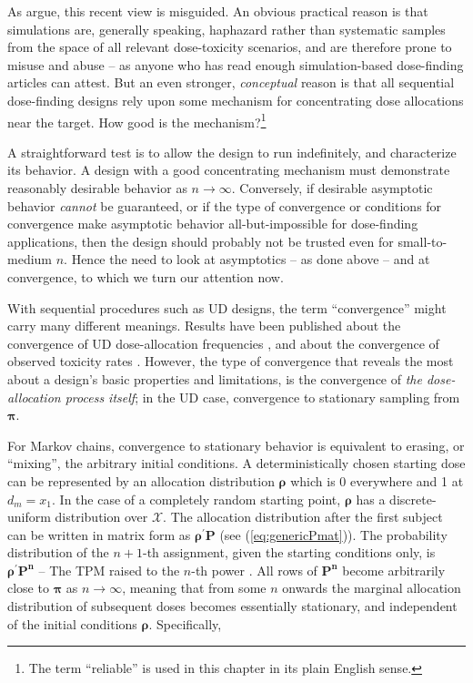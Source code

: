 As \cite{oron:azri:hoff:dose:2011} argue, this recent view is misguided. An obvious practical reason is that simulations are, generally speaking, haphazard rather than systematic samples from the space of all relevant dose-toxicity scenarios, and are therefore prone to misuse and abuse -- as anyone who has read enough simulation-based dose-finding articles can attest. But an even stronger,  \emph{conceptual} reason is that all sequential dose-finding designs rely upon some mechanism for concentrating dose allocations near the target. How good is the mechanism?\footnote{The term ``reliable'' is used in this chapter in its plain English sense.}

A straightforward test is to allow the design to run indefinitely, and characterize its behavior. A design with a good concentrating mechanism must demonstrate reasonably desirable behavior as $n\to\infty$. Conversely, if desirable asymptotic behavior \emph{cannot} be guaranteed, or if the type of convergence or conditions for convergence make asymptotic behavior all-but-impossible for dose-finding applications, then the design should probably not be trusted even for small-to-medium $n$. Hence the need to look at asymptotics -- as done above -- and at convergence, to which we turn our attention now.

With sequential procedures such as UD designs, the term ``convergence'' might carry many different meanings. Results have been published about the convergence of UD dose-allocation frequencies \citep{Durh:Flou:up-a:1995,Durh:Flou:Mont:up-a:1995}, and about the convergence of observed toxicity rates \citep{Flou:Durh:Rose:toxi:1995,oron:azri:hoff:dose:2011}. However, the type of convergence that reveals the most about a design's basic properties and limitations, is the convergence of \emph{the dose-allocation process itself}; in the UD case, convergence to stationary sampling from $\boldsymbol{\pi}$.

For Markov chains, convergence to stationary behavior is equivalent to erasing, or ``mixing'', the arbitrary initial conditions. A deterministically chosen starting dose can be represented by an allocation distribution $\boldsymbol{\rho}$ which is 0 everywhere and 1 at $d_m=x_1$. In the case of a completely random starting point, $\boldsymbol{\rho}$ has a discrete-uniform distribution over $\mathcal{X}$. The allocation distribution after the first subject can be written in matrix form as $\boldsymbol{\rho}^{'}\mathbf{P}$ (see (\ref{eq:genericPmat})). The probability distribution of the $n+1$-th assignment, given the starting conditions only, is $\boldsymbol{\rho}^{'}\mathbf{P^n}$ -- The TPM raised to the $n$-th power \citep{Diac:Stro:geom:1991}. All rows of $\mathbf{P^n}$ become arbitrarily close to $\boldsymbol{\pi}$ as $n\to\infty$, meaning that from some $n$ onwards the marginal allocation distribution of subsequent doses becomes essentially stationary, and independent of the initial conditions $\boldsymbol{\rho}$. Specifically,

